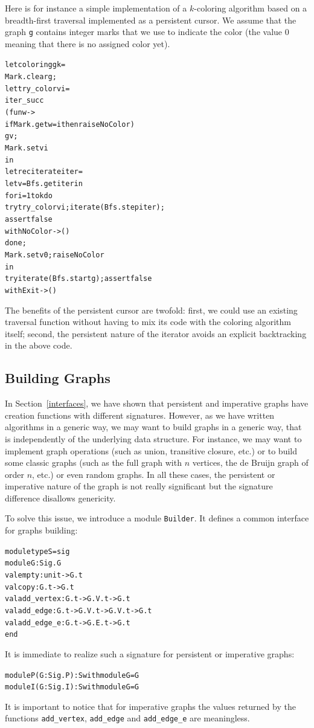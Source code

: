 \documentclass[]{tfp05symp}
\begin{document}
Here is for instance a simple implementation of a $k$-coloring
algorithm based on a breadth-first traversal implemented as a
persistent cursor. We assume that the graph \texttt{g} contains
integer marks that we use to indicate the color (the value 0 meaning
that there is no assigned color yet).
\begin{alltt}
let coloring g k =
  Mark.clear g;
  let try_color v i =
    iter_succ 
      (fun w -> 
        if Mark.get w = i then raise NoColor) 
      g v;
    Mark.set v i
  in
  let rec iterate iter =
    let v = Bfs.get iter in
    for i = 1 to k do
      try try_color v i; iterate (Bfs.step iter); 
          assert false
      with NoColor -> ()
    done;
    Mark.set v 0; raise NoColor
  in
  try iterate (Bfs.start g); assert false 
  with Exit -> ()
\end{alltt}
The benefits of the persistent cursor are twofold: first, we could use
an existing traversal function without having to mix its code with the
coloring algorithm itself; second, the persistent nature of the
iterator avoids an explicit backtracking in the above code.

\subsection{Building Graphs}\label{builder}

In Section~\ref{interfaces}, we have shown that persistent and
imperative graphs have creation functions with different
signatures. However, as we have written algorithms in a generic way,
we may want to build graphs in a generic way, that is independently of
the underlying data structure. For instance, we may want to implement
graph operations (such as union, transitive closure, etc.) or to build
some classic graphs (such as the full graph with $n$ vertices, the de
Bruijn graph of order $n$, etc.) or even random graphs. In all these
cases, the persistent or imperative nature of the graph is not really
significant but the signature difference disallows genericity.

To solve this issue, we introduce a module \texttt{Builder}. It
defines a common interface for graphs building:
\begin{alltt}
module type S = sig
  module G : Sig.G
  val empty : unit -> G.t
  val copy : G.t -> G.t
  val add_vertex : G.t -> G.V.t -> G.t
  val add_edge : G.t -> G.V.t -> G.V.t -> G.t
  val add_edge_e : G.t -> G.E.t -> G.t
end
\end{alltt}
It is immediate to realize such a signature for persistent or
imperative graphs:
\begin{alltt}
module P(G : Sig.P) : S with module G = G
module I(G : Sig.I) : S with module G = G
\end{alltt}
It is important to notice that for imperative graphs the values
returned by the functions \texttt{add\_vertex},
\texttt{add\_edge} and \texttt{add\_edge\_e} are meaningless.
\end{document}
